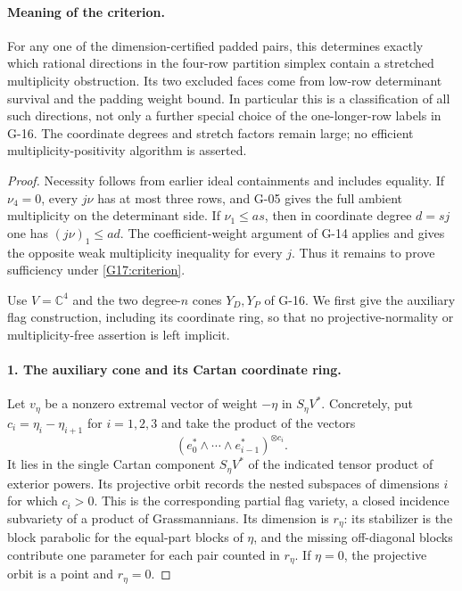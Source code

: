 \paragraph{Meaning of the criterion.}
For any one of the dimension-certified padded pairs, this determines
exactly which rational directions in the four-row partition simplex
contain a stretched multiplicity obstruction. Its two excluded faces
come from low-row determinant survival and the padding weight bound.
In particular this is a classification of all such directions,
not only a further special choice of the one-longer-row labels in G-16.
The coordinate degrees and stretch factors remain large; no efficient
multiplicity-positivity algorithm is asserted.

\begin{proof}
Necessity follows from earlier ideal containments and includes equality.
If $\nu_4=0$, every $j\nu$ has at most three rows, and G-05 gives
the full ambient multiplicity on the determinant side. If
$\nu_1\leq as$, then in coordinate degree $d=sj$ one has
$(j\nu)_1\leq ad$. The coefficient-weight argument of G-14 applies
and gives the opposite weak multiplicity inequality for every $j$.
Thus it remains to prove sufficiency under \eqref{G17:criterion}.

Use $V=\mathbb C^4$ and the two degree-$n$ cones $Y_D,Y_P$ of G-16.
We first give the auxiliary flag construction, including its coordinate
ring, so that no projective-normality or multiplicity-free assertion
is left implicit.

\paragraph{1. The auxiliary cone and its Cartan coordinate ring.}
Let $v_\eta$ be a nonzero extremal vector of weight $-\eta$ in
$S_\eta V^*$. Concretely, put
$c_i=\eta_i-\eta_{i+1}$ for $i=1,2,3$ and take the product of
the vectors
\[
 (e_0^*\wedge\cdots\wedge e_{i-1}^*)^{\otimes c_i}.
\]
It lies in the single Cartan component $S_\eta V^*$ of the indicated
tensor product of exterior powers. Its projective orbit records the
nested subspaces of dimensions $i$ for which $c_i>0$.
This is the corresponding partial flag variety, a closed incidence
subvariety of a product of Grassmannians. Its dimension is
$r_\eta$: its stabilizer is the block parabolic for the equal-part
blocks of $\eta$, and the missing off-diagonal blocks contribute
one parameter for each pair counted in $r_\eta$.
If $\eta=0$, the projective orbit is a point and $r_\eta=0$.


\end{proof}
